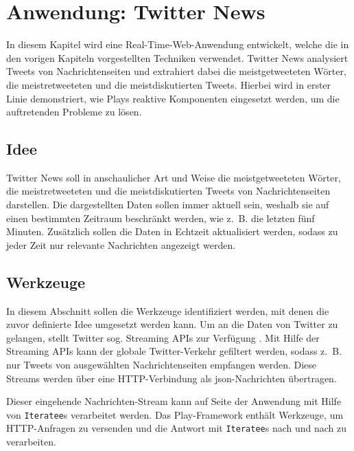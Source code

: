 
\chapter{Anwendung: Twitter News} %
\label{cha:anwendung}

In diesem Kapitel wird eine Real-Time-Web-Anwendung entwickelt, welche die in den vorigen Kapiteln vorgestellten Techniken verwendet.
Twitter News analysiert Tweets von Nachrichtenseiten und extrahiert dabei die meistgetweeteten Wörter, die meistretweeteten und die meistdiskutierten Tweets.
Hierbei wird in erster Linie demonstriert, wie Plays reaktive Komponenten eingesetzt werden, um die auftretenden Probleme zu lösen.

\section{Idee} %
\label{sec:idee}

Twitter News soll in anschaulicher Art und Weise die meistgetweeteten Wörter, die meistretweeteten und die meistdiskutierten Tweets von Nachrichtenseiten darstellen.
Die dargestellten Daten sollen immer aktuell sein, weshalb sie auf einen bestimmten Zeitraum beschränkt werden, wie z.~B. die letzten fünf Minuten.
Zusätzlich sollen die Daten in Echtzeit aktualisiert werden, sodass zu jeder Zeit nur relevante Nachrichten angezeigt werden.


\section{Werkzeuge} %
\label{sec:werkzeuge}

In diesem Abschnitt sollen die Werkzeuge identifiziert werden, mit denen die zuvor definierte Idee umgesetzt werden kann.
Um an die Daten von Twitter zu gelangen, stellt Twitter sog. Streaming APIs zur Verfügung \cite[vgl.][]{twitter_streaming_apis}.
Mit Hilfe der Streaming APIs kann der globale Twitter-Verkehr gefiltert werden, sodass z.~B. nur Tweets von ausgewählten Nachrichtenseiten empfangen werden.
Diese Streams werden über eine HTTP-Verbindung als \gls{json}-Nachrichten übertragen.

Dieser eingehende Nachrichten-Stream kann auf Seite der Anwendung mit Hilfe von \lstinline|Iteratee|s verarbeitet werden.
Das Play-Framework enthält Werkzeuge, um HTTP-Anfragen zu versenden und die Antwort mit \lstinline|Iteratee|s nach und nach zu verarbeiten.

